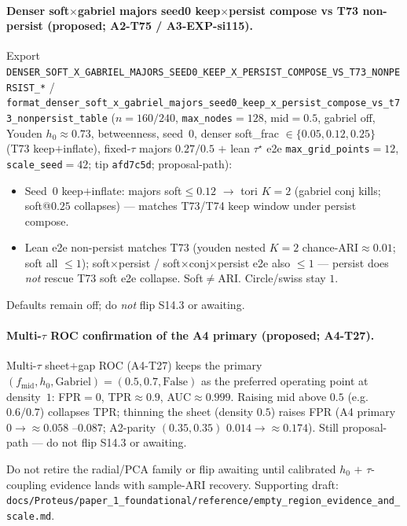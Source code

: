 \documentclass[11pt]{article}
\begin{document}
\paragraph{Denser soft$\times$gabriel majors seed0 keep$\times$persist compose
vs T73 non-persist (proposed; A2-T75 / A3-EXP-si115).}
Export
\texttt{DENSER\_SOFT\_X\_GABRIEL\_MAJORS\_SEED0\_KEEP\_X\_PERSIST\_COMPOSE\_VS\_T73\_NONPERSIST\_*} /
\texttt{format\_denser\_soft\_x\_gabriel\_majors\_seed0\_keep\_x\_persist\_compose\_vs\_t73\_nonpersist\_table}
($n{=}160/240$, \texttt{max\_nodes}${=}128$, mid${=}0.5$, gabriel off,
Youden $h_0\approx 0.73$, betweenness, seed~$0$, denser soft\_frac
$\in\{0.05,0.12,0.25\}$ (T73 keep${+}$inflate), fixed-$\tau$ majors
$0.27/0.5$ $+$ lean $\tau^\star$ e2e \texttt{max\_grid\_points}${=}12$,
\texttt{scale\_seed}${=}42$; tip \texttt{afd7c5d}; proposal-path):
\begin{itemize}[leftmargin=1.5em]
  \item Seed~$0$ keep${+}$inflate: majors soft$\le 0.12$ $\to$ tori $K{=}2$
  (gabriel conj kills; soft@$0.25$ collapses) --- matches T73/T74 keep
  window under persist compose.
  \item Lean e2e non-persist matches T73 (youden nested $K{=}2$
  chance-ARI$\approx 0.01$; soft all $\le 1$); soft$\times$persist /
  soft$\times$conj$\times$persist e2e also $\le 1$ --- persist does
  \emph{not} rescue T73 soft e2e collapse. Soft$\neq$ARI. Circle/swiss
  stay $1$.
\end{itemize}
Defaults remain off; do \emph{not} flip S14.3 or awaiting.

\paragraph{Multi-$\tau$ ROC confirmation of the A4 primary (proposed; A4-T27).}
Multi-$\tau$ sheet$+$gap ROC (A4-T27) keeps the primary
$(f_{\mathrm{mid}},h_0,\mathrm{Gabriel}){=}(0.5,0.7,\mathrm{False})$ as the
preferred operating point at density~$1$: FPR${=}0$, TPR$\approx 0.9$,
AUC$\approx 0.999$. Raising mid above $0.5$ (e.g.\ $0.6/0.7$) collapses TPR;
thinning the sheet (density $0.5$) raises FPR (A4 primary $0\to\approx 0.058$
--$0.087$; A2-parity $(0.35,0.35)$ $0.014\to\approx 0.174$). Still
proposal-path --- do not flip S14.3 or awaiting.

Do not retire the radial/PCA family or flip awaiting until calibrated $h_0$ $+$
$\tau$-coupling evidence lands with sample-ARI recovery. Supporting draft:
\texttt{docs/Proteus/paper\_1\_foundational/reference/empty\_region\_evidence\_and\_scale.md}.
\end{document}
